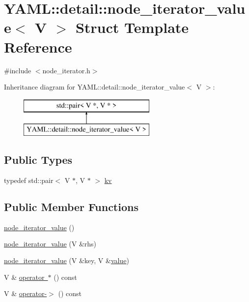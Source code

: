 \hypertarget{struct_y_a_m_l_1_1detail_1_1node__iterator__value}{}\section{Y\+A\+ML\+::detail\+::node\+\_\+iterator\+\_\+value$<$ V $>$ Struct Template Reference}
\label{struct_y_a_m_l_1_1detail_1_1node__iterator__value}


{\ttfamily \#include $<$node\+\_\+iterator.\+h$>$}

Inheritance diagram for Y\+A\+ML\+::detail\+::node\+\_\+iterator\+\_\+value$<$ V $>$\+:\begin{figure}[H]
\begin{center}
\leavevmode
\includegraphics[height=2.000000cm]{struct_y_a_m_l_1_1detail_1_1node__iterator__value}
\end{center}
\end{figure}
\subsection*{Public Types}
\begin{DoxyCompactItemize}
\item 
typedef std\+::pair$<$ V $\ast$, V $\ast$ $>$ \mbox{\hyperlink{struct_y_a_m_l_1_1detail_1_1node__iterator__value_a5744c67ddd6e716902be8f268c37a2b1}{kv}}
\end{DoxyCompactItemize}
\subsection*{Public Member Functions}
\begin{DoxyCompactItemize}
\item 
\mbox{\hyperlink{struct_y_a_m_l_1_1detail_1_1node__iterator__value_ac7dd7c3c759474ade81bce5f08318e77}{node\+\_\+iterator\+\_\+value}} ()
\item 
\mbox{\hyperlink{struct_y_a_m_l_1_1detail_1_1node__iterator__value_addbc26fb7d041b89c4191aece5163282}{node\+\_\+iterator\+\_\+value}} (V \&rhs)
\item 
\mbox{\hyperlink{struct_y_a_m_l_1_1detail_1_1node__iterator__value_a3d7d97c184a28526a72bf9399962a903}{node\+\_\+iterator\+\_\+value}} (V \&key, V \&\mbox{\hyperlink{glad_8h_a03aff08f73d7fde3d1a08e0abd8e84fa}{value}})
\item 
V \& \mbox{\hyperlink{struct_y_a_m_l_1_1detail_1_1node__iterator__value_a35cfd0fcd0a60abae1e8f259fe7413c7}{operator $\ast$}} () const
\item 
V \& \mbox{\hyperlink{struct_y_a_m_l_1_1detail_1_1node__iterator__value_ae8033063a711760583672207cc6dbd52}{operator-\/$>$}} () const
\end{DoxyCompactItemize}
